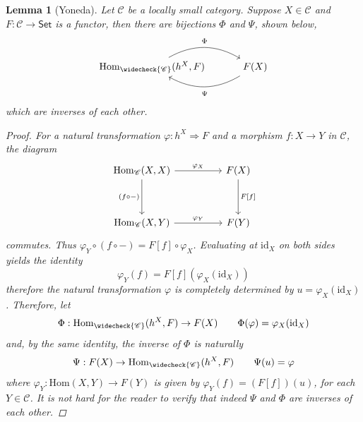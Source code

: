 \documentclass[10pt]{book}
\theoremstyle{bookplain}
\newtheorem{lemma}[theorem]{Lemma}
\theoremstyle{bookdefinition}
\theoremstyle{bookremark}
\begin{document}
\begin{lemma}[Yoneda]
    \label{thm:yoneda}
    Let $\mathscr{C}$ be a locally small category. Suppose $X\in\mathscr{C}$ and $F:\mathscr{C}\rightarrow\mathsf{Set}$ is a functor, then there are bijections $\Phi$ and $\Psi$, shown below, 
    \[\begin{tikzcd}[column sep=3em] %
        {\mathrm{Hom}_{\widecheck{\mathscr{C}}}(h^{X},F)}
        \arrow[rightarrow, r, bend left=30, "\Phi"{yshift=2pt}]
        & {F(X)}
        \arrow[rightarrow, l, bend left=30, "\Psi"{yshift=-2pt}]
    \end{tikzcd}
    \]
    which are inverses of each other.

    \begin{proof}
        For a natural transformation $\varphi:h^X\Rightarrow F$ and a morphism $f:X\rightarrow Y$ in $\mathscr{C}$, the diagram 
        \[
        \begin{tikzcd}[sep = huge]
        \mathrm{Hom}_{\mathscr{C}}(X,X) \arrow[r, "\varphi_X"] \arrow[d, "(f\circ - )"'] & F(X) \arrow[d, "F{[f]}"] \\
        \mathrm{Hom}_{\mathscr{C}}(X,Y) \arrow[r, "\varphi_Y"]                 & F(Y)               
        \end{tikzcd}\]
        commutes. Thus $\varphi_Y\circ (f\circ -)=F[f]\circ \varphi_X$. Evaluating at $\mathrm{id}_X$ on both sides yields the identity
        \[\varphi_Y(f)=F[f](\varphi_X(\mathrm{id}_X))\]
        therefore the natural transformation $\varphi$ is completely determined by $u=\varphi_X(\mathrm{id}_X)$. Therefore, let
        \[\Phi:\mathrm{Hom}_{\widecheck{\mathscr{C}}}(h^{X},F)\rightarrow F(X)\qquad \Phi(\varphi)=\varphi_X(\mathrm{id}_X)\]
        and, by the same identity, the inverse of $\Phi$ is naturally
        \[\Psi:F(X)\rightarrow \mathrm{Hom}_{\widecheck{\mathscr{C}}}(h^{X},F)\qquad \Psi(u)=\varphi\]
        where $\varphi_Y:\mathrm{Hom}(X,Y)\rightarrow F(Y)$ is given by $\varphi_Y(f)=(F[f])(u)$, for each $Y\in \mathscr{C}$. It is not hard for the reader to verify that indeed $\Psi$ and $\Phi$ are inverses of each other.
    \end{proof}
\end{lemma}
\end{document}
